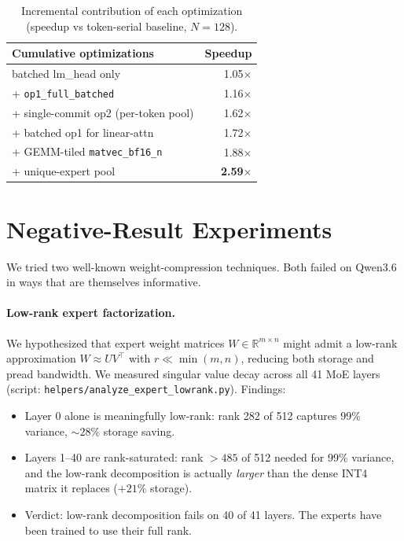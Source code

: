 \documentclass[11pt,a4paper]{article}
\begin{document}
\begin{table}[h]
\centering
\caption{Incremental contribution of each optimization (speedup vs
    token-serial baseline, $N{=}128$).}
\label{tab:incremental}
\begin{tabular}{lr}
\toprule
Cumulative optimizations & Speedup \\
\midrule
batched lm\_head only                          & 1.05$\times$ \\
+ \texttt{op1\_full\_batched}                  & 1.16$\times$ \\
+ single-commit op2 (per-token pool)           & 1.62$\times$ \\
+ batched op1 for linear-attn                  & 1.72$\times$ \\
+ GEMM-tiled \texttt{matvec\_bf16\_n}          & 1.88$\times$ \\
+ unique-expert pool                           & \textbf{2.59}$\times$ \\
\bottomrule
\end{tabular}
\end{table}

\section{Negative-Result Experiments}\label{sec:negative}

We tried two well-known weight-compression techniques. Both failed on
Qwen3.6 in ways that are themselves informative.

\paragraph{Low-rank expert factorization.} We hypothesized that expert
weight matrices $W \in \mathbb{R}^{m \times n}$ might admit a low-rank
approximation $W \approx U V^\top$ with $r \ll \min(m, n)$, reducing
both storage and pread bandwidth. We measured singular value decay
across all 41 MoE layers (script:
\texttt{helpers/analyze\_expert\_lowrank.py}). Findings:
\begin{itemize}
\item Layer 0 alone is meaningfully low-rank: rank 282 of 512 captures
    99\% variance, $\sim 28\%$ storage saving.
\item Layers 1--40 are rank-saturated: rank $> 485$ of 512 needed for
    99\% variance, and the low-rank decomposition is actually
    \emph{larger} than the dense INT4 matrix it replaces ($+21\%$
    storage).
\item Verdict: low-rank decomposition fails on 40 of 41 layers. The
    experts have been trained to use their full rank.
\end{itemize}
\end{document}
